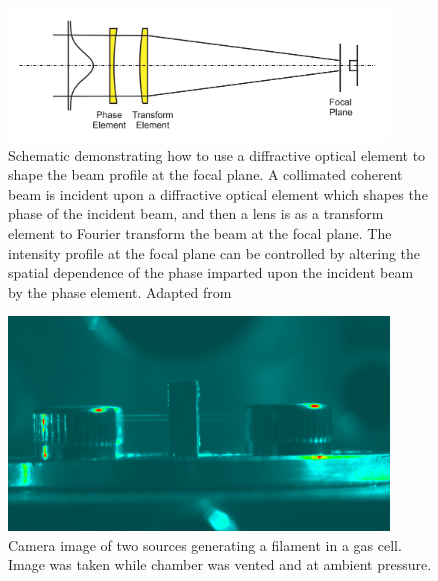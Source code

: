\begin{figure}
	\centering
	\includegraphics[width=0.9\textwidth]{figures/Two_source/romero_beam_shaping_schematic.png}
	\caption{Schematic demonstrating how to use a diffractive optical element to shape the beam profile at the focal plane. A collimated coherent beam is incident upon a diffractive optical element which shapes the phase of the incident beam, and then a lens is as a transform element to Fourier transform the beam at the focal plane.  The intensity profile at the focal plane can be controlled by altering the spatial dependence of the phase imparted upon the incident beam by the phase element. Adapted from \cite{romero_mathematical_2010-1}}
	\label{fourier_beam_shaping_scheme}
\end{figure}

\begin{figure}
	\centering
	\includegraphics[width=0.9\textwidth]{figures/Two_source/ts_filament_gas_cell.png}
	\caption{Camera image of two sources generating a filament in a gas cell. Image was taken while chamber was vented and at ambient pressure.}
	\label{ts_filament}
\end{figure}


